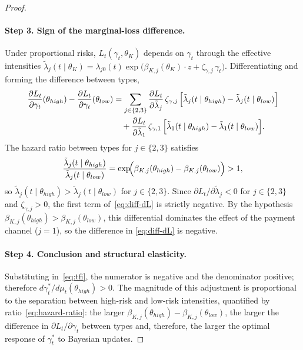 \documentclass[12pt,a4paper]{article}
\theoremstyle{plain}
\theoremstyle{definition}
\theoremstyle{remark}
\newcommand{\1}{\mathbf{1}}
\begin{document}
\begin{proof}
\paragraph{Step 3. Sign of the marginal-loss difference.}
Under proportional risks, $L_t(\gamma_t,\theta_K)$ depends on $\gamma_t$ through the
effective intensities
$\tilde{\lambda}_j(t\mid\theta_K)=\lambda_{j0}(t)
\exp\!\bigl(\beta_{K,j}(\theta_K)\cdot z+\zeta_{\gamma,j}\,\gamma_t\bigr)$.
Differentiating and forming the difference between types,
\begin{align}
\label{eq:diff-dL}
\frac{\partial L_t}{\partial\gamma_t}(\theta_{high})
-\frac{\partial L_t}{\partial\gamma_t}(\theta_{low})
&= \sum_{j\in\{2,3\}}\frac{\partial L_t}{\partial\tilde{\lambda}_j}\,
   \zeta_{\gamma,j}\,
   \Bigl[\tilde{\lambda}_j(t\mid\theta_{high})
         -\tilde{\lambda}_j(t\mid\theta_{low})\Bigr] \notag\\
&\quad
 + \frac{\partial L_t}{\partial\tilde{\lambda}_1}\,\zeta_{\gamma,1}\,
   \Bigl[\tilde{\lambda}_1(t\mid\theta_{high})
         -\tilde{\lambda}_1(t\mid\theta_{low})\Bigr].
\end{align}
The hazard ratio between types for $j\in\{2,3\}$ satisfies
\begin{equation}
\label{eq:hazard-ratio}
\frac{\tilde{\lambda}_j(t\mid\theta_{high})}
     {\tilde{\lambda}_j(t\mid\theta_{low})}
= \exp\!\Bigl(\beta_{K,j}(\theta_{high})-\beta_{K,j}(\theta_{low})\Bigr)
> 1,
\end{equation}
so $\tilde{\lambda}_j(t\mid\theta_{high})>\tilde{\lambda}_j(t\mid\theta_{low})$ for
$j\in\{2,3\}$. Since $\partial L_t/\partial\tilde{\lambda}_j<0$ for $j\in\{2,3\}$ and
$\zeta_{\gamma,j}>0$, the first term of~\eqref{eq:diff-dL} is strictly negative. By the
hypothesis $\beta_{K,j}(\theta_{high})>\beta_{K,j}(\theta_{low})$, this differential
dominates the effect of the payment channel ($j=1$), so the difference in
\eqref{eq:diff-dL} is negative.

\paragraph{Step 4. Conclusion and structural elasticity.}
Substituting in~\eqref{eq:tfi}, the numerator is negative and the denominator positive;
therefore $d\gamma_t^\ast/d\mu_t(\theta_{high})>0$. The magnitude of this adjustment is
proportional to the separation between high-risk and low-risk intensities, quantified by
ratio~\eqref{eq:hazard-ratio}: the larger
$\beta_{K,j}(\theta_{high})-\beta_{K,j}(\theta_{low})$, the larger the difference in
$\partial L_t/\partial\gamma_t$ between types and, therefore, the larger the optimal
response of $\gamma_t^\ast$ to Bayesian updates.
\end{proof}
\end{document}
